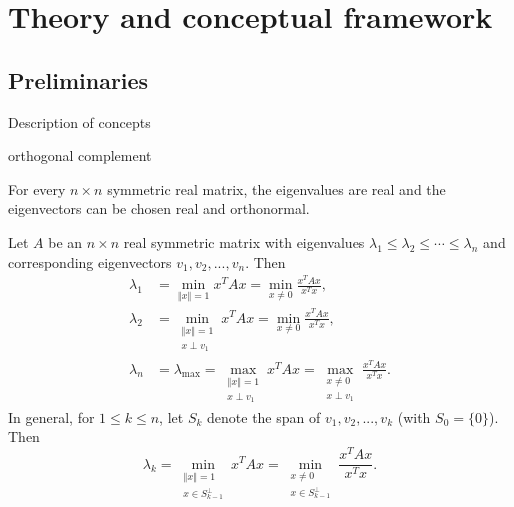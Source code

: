 %
%
\let\textcircled=\pgftextcircled
\chapter{Theory and conceptual framework}
\label{Chapter2}

\section{Preliminaries}
Description of concepts


\begin{definition}
orthogonal complement
\end{definition}

\begin{theorem}
	For every $n\times n$ symmetric real matrix, the eigenvalues are real and the eigenvectors can be chosen real and orthonormal.
\end{theorem}

\begin{theorem}
Let $A$ be an $n\times n$ real symmetric matrix with eigenvalues $\lambda_1 \leq \lambda_2 \leq \cdots \leq \lambda_n$ and corresponding eigenvectors $v_1, v_2,..., v_n$. Then 
\begin{align*}
	\lambda_1 &= \min_{\left \Vert x\right\Vert = 1} x^TAx = \min_{ x \neq 0} \frac{x^TAx}{x^Tx}, \\
	\lambda_2 &= \min_{\substack{\left \Vert x\right\Vert = 1 \\ x\perp v_1}} x^TAx = \min_{ x \neq 0} \frac{x^TAx}{x^Tx}, \\
	\lambda_n &= \lambda_{\text{max}} = \max_{\substack{\left \Vert x\right\Vert = 1 \\ x\perp v_1}} x^TAx = \max_{\substack{ x \neq 0 \\ x\perp v_1}} \frac{x^TAx}{x^Tx}.
\end{align*}
In general, for $1\leq k \leq n$, let $S_k$ denote the span of $v_1, v_2,..., v_k$ (with $S_0=\{0\}$). Then 
\begin{displaymath}
	\lambda_k = \min_{\substack{\left \Vert x\right\Vert = 1 \\ x\in S_{k-1}^\perp}} x^TAx = \min_{\substack{x \neq 0 \\ x\in S_{k-1}^\perp}} \frac{x^TAx}{x^Tx}.
\end{displaymath}
\end{theorem}

